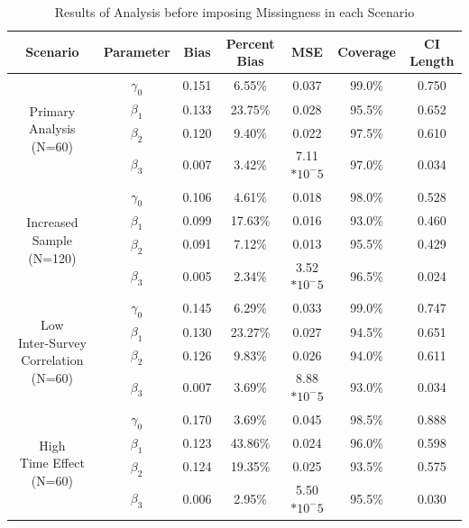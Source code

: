 \documentclass{svjour3}\usepackage[]{graphicx}\usepackage[]{color}
\begin{document}
\begin{table}[b!]
	\centering
	\caption{Results of Analysis before imposing Missingness in each Scenario}
	\setlength{\tabcolsep}{0.1cm}
	\label{tab:table2}
	\begin{tabular}{cc|ccccc}
		\toprule
		Scenario & Parameter & Bias & Percent Bias & MSE & Coverage & CI Length \\
		\midrule
		\multirow{4}{*}{\parbox{2cm}{Primary \\ Analysis (N=60)}} 
		& $\gamma_0$ & 0.151 & 6.55\% & 0.037 & 99.0\% & 0.750 \\
		& $\beta_1$ & 0.133 & 23.75\% & 0.028 & 95.5\% & 0.652 \\
		& $\beta_2$ & 0.120 & 9.40\% & 0.022 & 97.5\% & 0.610 \\
		& $\beta_3$ & 0.007 & 3.42\% & 7.11$*10^-5$ & 97.0\% & 0.034 \\
		\midrule
		\midrule
		\multirow{4}{*}{\parbox{2cm}{Increased \\ Sample (N=120)}} 
		& $\gamma_0$ & 0.106 & 4.61\% & 0.018 & 98.0\% & 0.528 \\
		& $\beta_1$ & 0.099 & 17.63\% & 0.016 & 93.0\% & 0.460 \\
		& $\beta_2$ & 0.091 & 7.12\% & 0.013 & 95.5\% & 0.429 \\
		& $\beta_3$ & 0.005 & 2.34\% & 3.52$*10^-5$ & 96.5\% & 0.024 \\
		\midrule
		\midrule
		\multirow{4}{*}{\parbox{2cm}{Low \\Inter-Survey Correlation (N=60)}} 
		& $\gamma_0$ & 0.145 & 6.29\% & 0.033 & 99.0\% & 0.747 \\
		& $\beta_1$ & 0.130 & 23.27\% & 0.027 & 94.5\% & 0.651 \\
		& $\beta_2$ & 0.126 & 9.83\% & 0.026 & 94.0\% & 0.611 \\
		& $\beta_3$ & 0.007 & 3.69\% & 8.88$*10^-5$ & 93.0\% & 0.034 \\
		\midrule
		\midrule
		\multirow{4}{*}{\parbox{2cm}{High \\Time Effect (N=60)}}
		& $\gamma_0$ & 0.170 & 3.69\% & 0.045 & 98.5\% & 0.888 \\
		& $\beta_1$ & 0.123 & 43.86\% & 0.024 & 96.0\% & 0.598 \\
		& $\beta_2$ & 0.124 & 19.35\% & 0.025 & 93.5\% & 0.575 \\
		& $\beta_3$ & 0.006 & 2.95\% & 5.50$*10^-5$ & 95.5\% & 0.030 \\
		\bottomrule
	\end{tabular}
\end{table}
\end{document}
